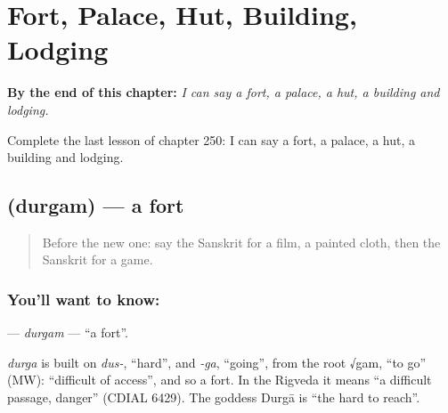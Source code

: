 
\chapter{Fort, Palace, Hut, Building, Lodging}
\label{ch:sa-fort-palace-hut-building-lodging}

\begin{chapteropening}
\textbf{By the end of this chapter:} \emph{I can say a fort, a palace, a hut, a building and lodging.}

Complete the last lesson of chapter 250: I can say a fort, a palace, a hut, a building and lodging.
\end{chapteropening}

\section[\texorpdfstring{\sk{दुर्गम्} (durgam)}{दुर्गम् (durgam)}]{ (durgam) — a fort}

\label{lesson:SA-C250-durgam}



\begin{quote}
Before the new one: say the Sanskrit for a film, a painted cloth, then the Sanskrit for a game.
\end{quote}

\subsection*{You'll want to know: }
\textbf{} — \emph{durgam} — \textquotedblleft{}a fort\textquotedblright{}.

\begin{cousinweb}
\emph{durga} is built on \emph{dus-}, \textquotedblleft{}hard\textquotedblright{}, and \emph{-ga}, \textquotedblleft{}going\textquotedblright{}, from the root √gam, \textquotedblleft{}to go\textquotedblright{} (MW): \textquotedblleft{}difficult of access\textquotedblright{}, and so a fort. In the Rigveda it means \textquotedblleft{}a difficult passage, danger\textquotedblright{} (CDIAL 6429). The goddess Durgā is \textquotedblleft{}the hard to reach\textquotedblright{}.
\end{cousinweb}

